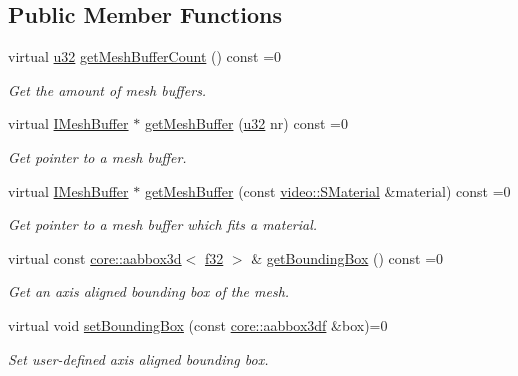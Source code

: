 \subsection*{Public Member Functions}
\begin{DoxyCompactItemize}
\item 
virtual \hyperlink{namespaceirr_a0416a53257075833e7002efd0a18e804}{u32} \hyperlink{classirr_1_1scene_1_1IMesh_a2ebed0bdae2d6537c36b0b7ac831edb8}{get\+Mesh\+Buffer\+Count} () const =0
\begin{DoxyCompactList}\small\item\em Get the amount of mesh buffers. \end{DoxyCompactList}\item 
virtual \hyperlink{classirr_1_1scene_1_1IMeshBuffer}{I\+Mesh\+Buffer} $\ast$ \hyperlink{classirr_1_1scene_1_1IMesh_a2cd1a04b396235101f426befba0c5b82}{get\+Mesh\+Buffer} (\hyperlink{namespaceirr_a0416a53257075833e7002efd0a18e804}{u32} nr) const =0
\begin{DoxyCompactList}\small\item\em Get pointer to a mesh buffer. \end{DoxyCompactList}\item 
virtual \hyperlink{classirr_1_1scene_1_1IMeshBuffer}{I\+Mesh\+Buffer} $\ast$ \hyperlink{classirr_1_1scene_1_1IMesh_a9573dace82efb01ba1f35f9cc28a4ced}{get\+Mesh\+Buffer} (const \hyperlink{classirr_1_1video_1_1SMaterial}{video\+::\+S\+Material} \&material) const =0
\begin{DoxyCompactList}\small\item\em Get pointer to a mesh buffer which fits a material. \end{DoxyCompactList}\item 
virtual const \hyperlink{classirr_1_1core_1_1aabbox3d}{core\+::aabbox3d}$<$ \hyperlink{namespaceirr_a0277be98d67dc26ff93b1a6a1d086b07}{f32} $>$ \& \hyperlink{classirr_1_1scene_1_1IMesh_ada6ecee9cbebed8bb67fd92872552ea0}{get\+Bounding\+Box} () const =0
\begin{DoxyCompactList}\small\item\em Get an axis aligned bounding box of the mesh. \end{DoxyCompactList}\item 
virtual void \hyperlink{classirr_1_1scene_1_1IMesh_a0aee3b5bc5d31ce996becc069f65e642}{set\+Bounding\+Box} (const \hyperlink{namespaceirr_1_1core_adfc8fa01b30044c55f3332a1d6c1aa19}{core\+::aabbox3df} \&box)=0
\begin{DoxyCompactList}\small\item\em Set user-\/defined axis aligned bounding box. \end{DoxyCompactList}\item 

\end{DoxyCompactItemize}

